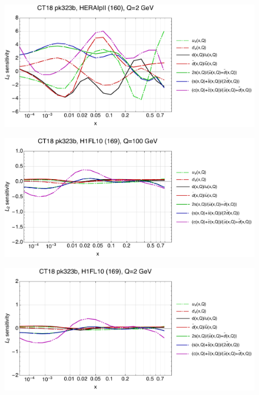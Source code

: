 \documentclass[10pt,aps,prd,floatfix,titlepage]{revtex4}
\begin{document}
\begin{figure}
\includegraphics[width=\textwidth,height=0.44\textheight,keepaspectratio]{2/160_ct18nn_q2_Sf_2.pdf}
\caption{}
\end{figure}
\clearpage
\begin{figure}
\includegraphics[width=\textwidth,height=0.44\textheight,keepaspectratio]{2/169_ct18nn_q100_Sf_2.pdf}
\caption{}
\end{figure}
\begin{figure}
\includegraphics[width=\textwidth,height=0.44\textheight,keepaspectratio]{2/169_ct18nn_q2_Sf_2.pdf}
\caption{}
\end{figure}
\end{document}
